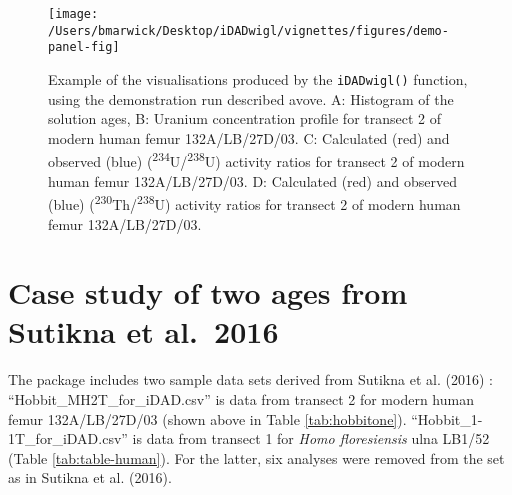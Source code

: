 \documentclass[]{elsarticle} %
\begin{document}
\begin{figure}
\texttt{[image: /Users/bmarwick/Desktop/iDADwigl/vignettes/figures/demo-panel-fig]} \caption{Example of the visualisations produced by the \texttt{iDADwigl()} function, using the demonstration run described avove. A: Histogram of the solution ages, B: Uranium concentration profile for transect 2 of modern human femur 132A/LB/27D/03. C: Calculated (red) and observed (blue) (\textsuperscript{234}U/\textsuperscript{238}U) activity ratios for transect 2 of modern human femur 132A/LB/27D/03. D: Calculated (red) and observed (blue) (\textsuperscript{230}Th/\textsuperscript{238}U) activity ratios for transect 2 of modern human femur 132A/LB/27D/03.}\label{fig:demopanelfig}
\end{figure}

\FloatBarrier

\newpage

\hypertarget{case-study-of-two-ages-from-sutikna-et-al.2016}{%
\section{Case study of two ages from Sutikna et al.~2016}\label{case-study-of-two-ages-from-sutikna-et-al.2016}}

The package includes two sample data sets derived from Sutikna et al. (2016) : ``Hobbit\_MH2T\_for\_iDAD.csv'' is data from transect 2 for modern human femur 132A/LB/27D/03 (shown above in Table \ref{tab:hobbitone}). ``Hobbit\_1-1T\_for\_iDAD.csv'' is data from transect 1 for \emph{Homo floresiensis} ulna LB1/52 (Table \ref{tab:table-human}). For the latter, six analyses were removed from the set as in Sutikna et al. (2016).
\end{document}
